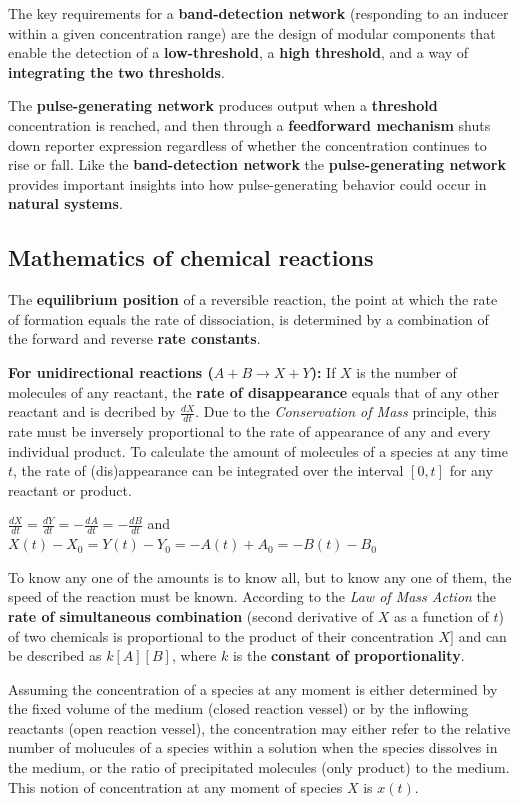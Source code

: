 \documentclass[10pt,a4paper]{report}
\begin{document}
	The key requirements for a \textbf{band-detection network} (responding to an inducer within a given concentration range) are the design of modular components that enable the detection of a \textbf{low-threshold}, a \textbf{high threshold}, and a way of \textbf{integrating the two thresholds}.
	
	The \textbf{pulse-generating network} produces output when a \textbf{threshold} concentration is reached, and then through a \textbf{feedforward mechanism} shuts down reporter expression regardless of whether the concentration continues to rise or fall.
	Like the \textbf{band-detection network} the \textbf{pulse-generating network} provides important insights into how pulse-generating behavior could occur in \textbf{natural systems}.
	
	\subsection{Mathematics of chemical reactions}
	The \textbf{equilibrium position} of a reversible reaction, the point at which the rate of formation equals the rate of dissociation, is determined by a combination of the forward and reverse \textbf{rate constants}.
	
	\textbf{For unidirectional reactions ($A + B \rightarrow X + Y$):} If $X$ is the number of molecules of any reactant, the \textbf{rate of disappearance} equals that of any other reactant and is decribed by $\frac{dX}{dt}$. 
	Due to the \emph{Conservation of Mass} principle, this rate must be inversely proportional to the rate of appearance of any and every individual product. 
	To calculate the amount of molecules of a species at any time $t$, the rate of (dis)appearance can be integrated over the interval $[0,t]$ for any reactant or product.
	
	$\frac{dX}{dt} = \frac{dY}{dt} = -\frac{dA}{dt} = -\frac{dB}{dt}$ and $X(t) - X_0 = Y(t) - Y_0 = -A(t) + A_0 = -B(t) - B_0$
	
	To know any one of the amounts is to know all, but to know any one of them, the speed of the reaction must be known. 
	According to the \emph{Law of Mass Action} the \textbf{rate of simultaneous combination} (second derivative of $X$ as a function of $t$) of two chemicals is proportional to the product of their concentration $X]$ and can be described as $k[A][B]$, where $k$ is the \textbf{constant of proportionality}.
	
	Assuming the concentration of a species at any moment is either determined by the fixed volume of the medium (closed reaction vessel) or by the inflowing reactants (open reaction vessel), the concentration may either refer to the relative number of molucules of a species within a solution when the species dissolves in the medium, or the ratio of precipitated molecules (only product) to the medium. 
	This notion of concentration at any moment of species $X$ is $x(t)$.
	
\end{document}
